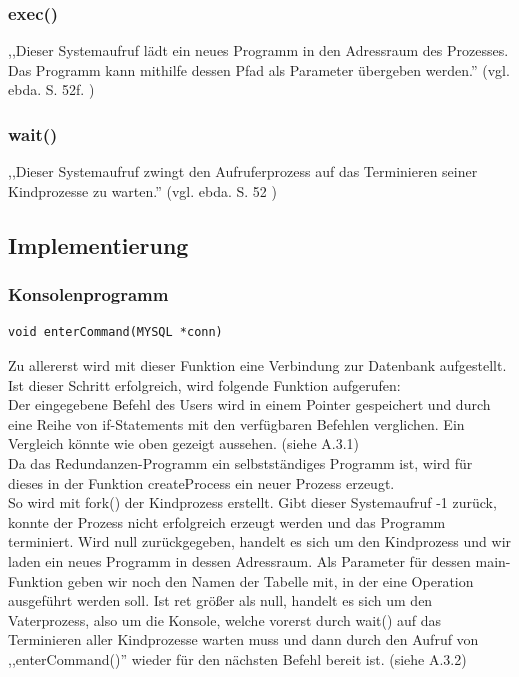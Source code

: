 \documentclass[12pt]{report}
\begin{document}
\subsubsection{exec()}
,,Dieser Systemaufruf lädt ein neues Programm in den Adressraum des Prozesses. Das Programm kann mithilfe dessen Pfad als Parameter übergeben werden.'' (vgl. ebda. S. 52f. \nocite{OS})

\subsubsection{wait()}
,,Dieser Systemaufruf zwingt den Aufruferprozess auf das Terminieren seiner Kindprozesse zu warten.'' (vgl. ebda. S. 52 \nocite{OS})

\subsection{Implementierung}

\subsubsection{Konsolenprogramm}

\begin{lstlisting}
void enterCommand(MYSQL *conn)
\end{lstlisting}

\noindent Zu allererst wird mit dieser Funktion eine Verbindung zur Datenbank aufgestellt. Ist dieser Schritt erfolgreich, wird folgende Funktion aufgerufen:\\

\noindent Der eingegebene Befehl des Users wird in einem Pointer gespeichert und durch eine Reihe von if-Statements mit den verfügbaren Befehlen verglichen. Ein Vergleich könnte wie oben gezeigt aussehen. (siehe A.3.1)\\

\noindent Da das Redundanzen-Programm ein selbstständiges Programm ist, wird für dieses in der Funktion createProcess ein neuer Prozess erzeugt.\\
So wird mit fork() der Kindprozess erstellt. Gibt dieser Systemaufruf -1 zurück, konnte der Prozess nicht erfolgreich erzeugt werden und das Programm terminiert. Wird null zurückgegeben, handelt es sich um den Kindprozess und wir laden ein neues Programm in dessen Adressraum. Als Parameter für dessen main-Funktion geben wir noch den Namen der Tabelle mit, in der eine Operation ausgeführt werden soll. Ist ret größer als null, handelt es sich um den Vaterprozess, also um die Konsole, welche vorerst durch wait() auf das Terminieren aller Kindprozesse warten muss und dann durch den Aufruf von ,,enterCommand()'' wieder für den nächsten Befehl bereit ist. (siehe A.3.2)\\
\end{document}
